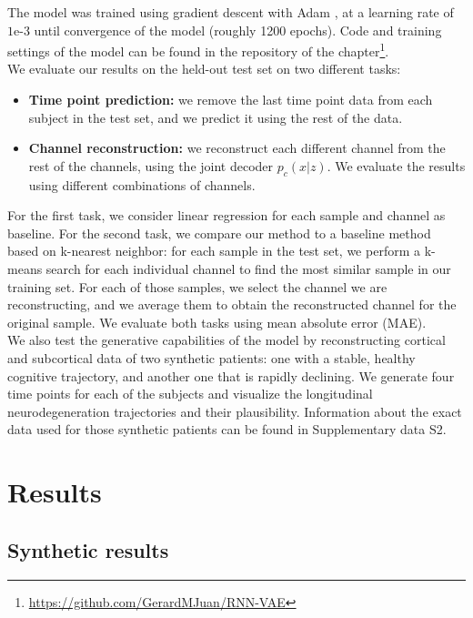 The model was trained using gradient descent with Adam \cite{Kingma2015a}, at a learning rate of $1\text{e-}3$ until convergence of the model (roughly 1200 epochs). Code and training settings of the model can be found in the repository of the chapter\footnote{\url{https://github.com/GerardMJuan/RNN-VAE}}. \\

We evaluate our results on the held-out test set on two different tasks: 

\begin{itemize}
    \item \textbf{Time point prediction:} we remove the last time point data from each subject in the test set, and we predict it using the rest of the data. 
    \item \textbf{Channel reconstruction:} we reconstruct each different channel from the rest of the channels, using the joint decoder $p_c(x|z)$. We evaluate the results using different combinations of channels.
\end{itemize}

For the first task, we consider linear regression for each sample and channel as baseline. For the second task, we compare our method to a baseline method based on k-nearest neighbor: for each sample in the test set, we perform a k-means search for each individual channel to find the most similar sample in our training set. For each of those samples, we select the channel we are reconstructing, and we average them to obtain the reconstructed channel for the original sample. We evaluate both tasks using mean absolute error (MAE). \\

We also test the generative capabilities of the model by reconstructing cortical and subcortical data of two synthetic patients: one with a stable, healthy cognitive trajectory, and another one that is rapidly declining. We generate four time points for each of the subjects and visualize the longitudinal neurodegeneration trajectories and their plausibility. Information about the exact data used for those synthetic patients can be found in Supplementary data S2. \\

\section{Results}
\label{rnn:results}

\subsection{Synthetic results}

